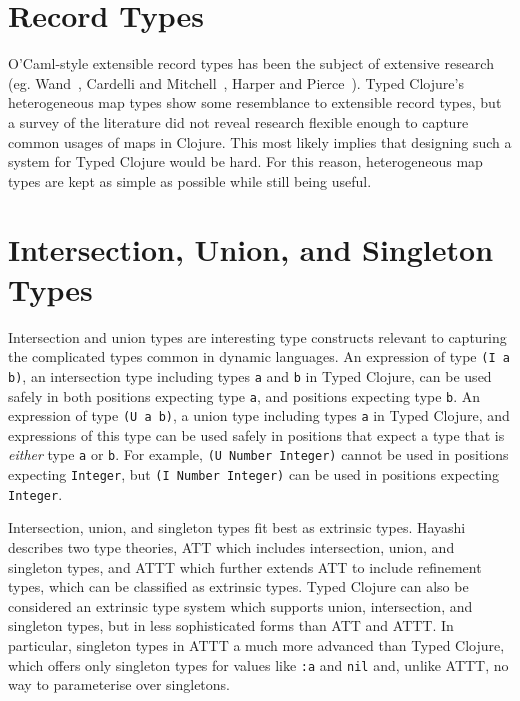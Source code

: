 \section{Record Types}
\label{sec:recordtypes}

O'Caml-style extensible record types has been the subject of extensive research 
(eg. Wand~\cite{Wan89}, Cardelli and Mitchell~\cite{CM91}, Harper and Pierce~\cite{HP91}).
Typed Clojure's heterogeneous map types show some resemblance to extensible
record types, but a survey of the literature did not reveal research flexible
enough to capture common usages of maps in Clojure.
This most likely implies that designing such a system for Typed Clojure would be hard.
For this reason, heterogeneous map types are kept as simple as possible while still being useful.

\section{Intersection, Union, and Singleton Types}
\label{sec:intersectionunion}

Intersection and union types are interesting type constructs relevant to capturing the complicated
types common in dynamic languages.
An expression of type \lstinline|(I a b)|, an intersection type including types \lstinline|a|
and \lstinline|b| in Typed Clojure, can be used safely in both positions expecting type \lstinline|a|,
and positions expecting type \lstinline|b|.
An expression of type \lstinline|(U a b)|, a union type including types \lstinline|a| in Typed Clojure,
and expressions of this type can be used safely in positions 
that expect a type that is \emph{either} type \lstinline|a|
or \lstinline|b|.
For example, \lstinline|(U Number Integer)| cannot be used in positions expecting \lstinline|Integer|,
but \lstinline|(I Number Integer)| can be used in positions expecting \lstinline|Integer|.

Intersection, union, and singleton types fit best as extrinsic types.
Hayashi~\cite{Hay91} describes two type theories, ATT which includes
intersection, union, and singleton types, and ATTT which further extends ATT
to include refinement types, which can be classified as extrinsic types.
Typed Clojure can also be considered an extrinsic type system which supports
union, intersection, and singleton types, but in less sophisticated forms
than ATT and ATTT.
In particular, singleton types in ATTT a much more advanced than Typed Clojure,
which offers only singleton types for values like \lstinline|:a| and \lstinline|nil|
and, unlike ATTT, no way to parameterise over singletons.

